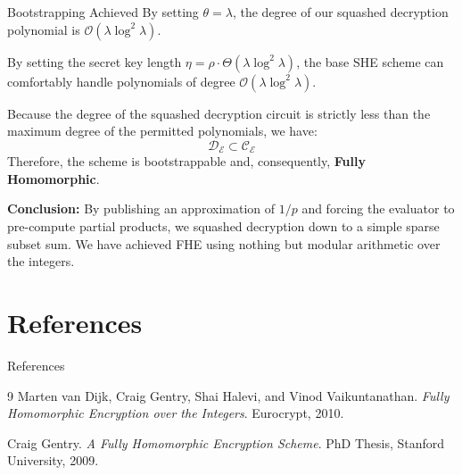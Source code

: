\documentclass[10pt, aspectratio=169]{beamer}
\begin{document}
\begin{frame}{Bootstrapping Achieved}
    By setting $\theta = \lambda$, the degree of our squashed decryption polynomial is $\mathcal{O}(\lambda \log^2 \lambda)$.
    \pause
    
    \vspace{0.3cm}
    \begin{theorem}
    By setting the secret key length $\eta = \rho \cdot \Theta(\lambda \log^2 \lambda)$, the base SHE scheme can comfortably handle polynomials of degree $\mathcal{O}(\lambda \log^2 \lambda)$. 
    
    Because the degree of the squashed decryption circuit is strictly less than the maximum degree of the permitted polynomials, we have:
    $$\mathcal{D}_{\mathcal{E}} \subset \mathcal{C}_{\mathcal{E}}$$
    Therefore, the scheme is bootstrappable and, consequently, \textbf{Fully Homomorphic}.
    \end{theorem}
    \pause
    
    \vspace{0.3cm}
    \textbf{Conclusion:} By publishing an approximation of $1/p$ and forcing the evaluator to pre-compute partial products, we squashed decryption down to a simple sparse subset sum. We have achieved FHE using nothing but modular arithmetic over the integers.
\end{frame}

\section{References}
\begin{frame}{References}
    \begin{thebibliography}{9}
        Marten van Dijk, Craig Gentry, Shai Halevi, and Vinod Vaikuntanathan.
        \textit{Fully Homomorphic Encryption over the Integers}. 
        Eurocrypt, 2010.
        
        Craig Gentry.
        \textit{A Fully Homomorphic Encryption Scheme}. 
        PhD Thesis, Stanford University, 2009.
    \end{thebibliography}
\end{frame}
\end{document}
